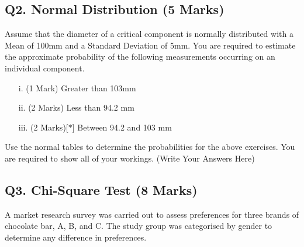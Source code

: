 \documentclass[a4paper,12pt]{article}
\begin{document}
\subsection*{Q2. Normal Distribution (5 Marks)} %
Assume that the diameter of a critical component is normally distributed with a Mean of 100mm and a Standard Deviation of 5mm. You are required  to estimate the approximate probability of the following measurements occurring on an individual component.
\begin{itemize}
	\item [i.](1 Mark)	Greater than 103mm
	\item [ii.](2 Marks) Less than 94.2 mm
	\item [iii.](2 Marks)[$\ast$] Between 94.2 and 103 mm
\end{itemize}
\bigskip
\noindent Use the normal tables to determine the probabilities for the above exercises. You are required to show all of your workings.
\newpage
(Write Your Answers Here)
\newpage

\subsection*{Q3. Chi-Square Test (8 Marks)} %

A market research survey was carried out to assess preferences for three brands of chocolate bar, A, B, and C. 
The study group was categorised by gender to determine any difference in preferences.
\end{document}
